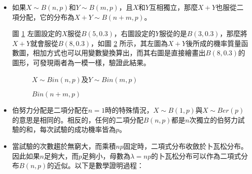 \documentclass[12pt, a4paper]{article}
\begin{document}
\begin{itemize}
\item 如果$X \sim B(n,p)$和$Y \sim B(m,p)$，且$X$和$Y$互相獨立，那麼$X+Y$也服從二項分配，它的分布為$X+Y \sim B(n+m,p)$。

圖 \ref{fig:binomial(n,p)binomial(m,p)} 左圖設定的$X$服從$B(5,0.3)$，右圖設定的$Y$服從的是$B(3,0.3)$，那麼將$X+Y$就會服從$B(8,0.3)$，如圖 \ref{fig:binomial(n+m,p)} 所示，其左圖為$X+Y$後所成的機率質量函數圖，相加方式也可以用變數變換算出，而其右圖是直接繪畫出$B(8,0.3)$的圖形，可發現兩者為一模一樣，驗證此結果。
\begin{figure}[h]
    \caption{$X \sim Bin(n,p)$及$Y \sim Bin(m,p)$}
    \label{fig:binomial(n,p)binomial(m,p)}
\end{figure}
\begin{figure}[h]
    \caption{$Bin(n+m,p)$}
    \label{fig:binomial(n+m,p)}
\end{figure}

\item 伯努力分配是二項分配在$n=1$時的特殊情況，$X \sim B(1,p)$與$X\sim Ber(p)$的意思是相同的。相反的，任何的二項分配$B(n,p)$都是$n$次獨立的伯努力試驗的和，每次試驗的成功機率皆為$p$。


 
\item 當試驗的次數趨於無窮大，而乘積$np$固定時，二項式分布收斂於卜瓦松分布。因此如果$n$足夠大，而$p$足夠小，母數為$\lambda =np$的卜瓦松分布可以作為二項式分布$B(n,p)$的近似。以下是數學證明過程：


\end{itemize}
\end{document}
